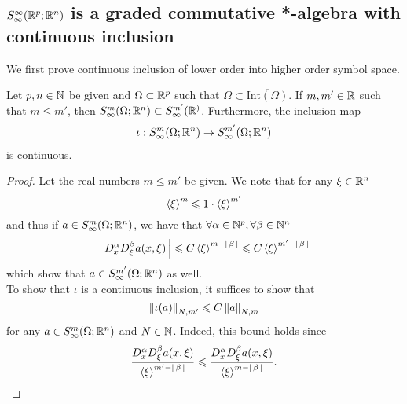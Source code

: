 \documentclass{article}
\begin{document}
\subsection{$S^{\infty}_\infty(\R^{p}; \R^n)$ is a graded commutative *-algebra with continuous inclusion} 
We first prove continuous inclusion of lower order into higher order symbol space. 
\begin{fprop}
    Let $p, n \in \N$ be given and $\Omega \subset \R^p$ such that $\Omega \subset \overline{\mathrm{Int}(\Omega)}$. If $m, m' \in \R$ such that $m \leq m'$, then $S^m_\infty(\Omega; \R^n) \subset S^{m'}_\infty(\R^)$. Furthermore, the inclusion map 
    \begin{align*}
    \iota: S^m_\infty(\Omega; \R^n) \to S^{m'}_\infty(\Omega; \R^n)
    \end{align*}
    is continuous. 
\end{fprop}
\begin{proof}
    Let the real numbers $m \leq m'$ be given. We note that for any $\xi \in \R^n$
    \[
    \sym[\xi]^m \leq 1 \cdot \sym[\xi]^{m'}
    \]
    and thus if $a \in S^{m}_\infty(\Omega; \R^n)$, we have that $\forall \alpha \in \N^p, \forall \beta \in \N^n$
    \[
    \abs{D^\alpha_x D^\beta_\xi a(x, \xi)} \leq C \sym[\xi]^{m - \abs{\beta}} \leq C \sym[\xi]^{m' - \abs{\beta}} 
    \]
    which show that $a \in S^{m'}_\infty(\Omega; \R^n)$ as well. \\
    
    To show that $\iota$ is a continuous inclusion, it suffices to show that 
    \[
    \norm[\iota(a)]_{N, m'} \leq C \norm[a]_{N, m}
    \]
    for any $a \in S^{m}_\infty(\Omega; \R^n)$ and $N \in \N$. Indeed, this bound holds since 
    \[
    \frac{D^\alpha_x D^\beta_\xi a(x, \xi)}{\sym[\xi]^{m' - \abs{\beta}}}  \leq \frac{D^\alpha_x D^\beta_\xi a(x, \xi)}{\sym[\xi]^{m - \abs{\beta}}}. 
    \]
\end{proof}
\hfill \\ [3em]
\end{document}
